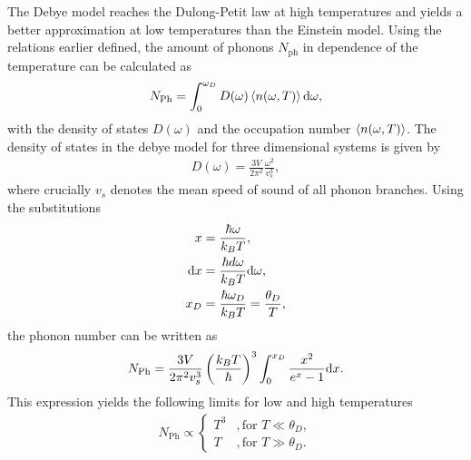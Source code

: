 The Debye model reaches the Dulong-Petit law at high temperatures and yields a better approximation at low temperatures than the Einstein model. \newline
Using the relations earlier defined, the amount of phonons $N_{\text{ph}}$ in dependence of the temperature can be calculated as
\begin{align}
    N_{\text{Ph}} = \int_0^{\omega_D}D(\omega) \braket{n(\omega,T)}\text d\omega,
    \label{eq:N_ph_int}
\end{align}
with the density of states $D(\omega)$ and the occupation number $\braket{n(\omega,T)}$.
The density of states in the debye model for three dimensional systems is given by 
\begin{align}
    D(\omega) = \frac{3V}{2\pi^2}\frac{\omega^2}{v_s^3},
\end{align}
where crucially $v_s$ denotes the mean speed of sound of all phonon branches.
Using the substitutions
\begin{align}
    \label{eq:substitution_x_II}
    x &= \frac{\hbar\omega}{k_BT}, \\
    \label{eq:substitution_dx_II}
    \text dx &= \frac{\hbar d\omega}{k_BT}\text d\omega, \\
    \label{eq:substitution_x_D}
    x_D &= \frac{\hbar\omega_D}{k_BT} = \frac{\theta_D}{T},
\end{align}
the phonon number can be written as
\begin{align}
    N_{\text{Ph}} = \frac{3V}{2\pi^2v_s^3}\left(\frac{k_BT}{\hbar}\right)^3\int_0^{x_D}\frac{x^2}{e^x-1}\text dx.
    \label{eq:N_ph}
\end{align}
This expression yields the following limits for low and high temperatures
\begin{align}
    N_{\text{Ph}}\propto
    \begin{cases}
        T^3 &, \text{for } T\ll\theta_D, \\
        T &,\text{for } T\gg\theta_D.
    \end{cases}
\end{align}